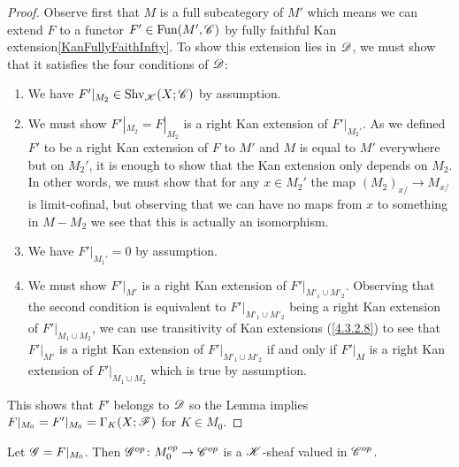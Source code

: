 \documentclass[../../thesis.tex]{subfiles}
\begin{document}
\begin{proof}
    Observe first that $M$ is a full subcategory of $M'$ which means we can extend $F$ to a functor $F'\in\mathrm{Fun}(M',\mathscr{C})$ by fully faithful Kan extension\ref{KanFullyFaithInfty}.
    To show this extension lies in $\mathscr{D}$, we must show that it satisfies the four conditions of $\mathscr{D}$:
    \begin{enumerate}
        \item We have $F'|_{M_2} \in \mathrm{Shv}_{\mathscr{K}}(X;\mathscr{C})$ by assumption.
        \item We must show $F'|_{M_2}=F|_{M_2}$ is a right Kan extension of $F'|_{M_2'}$.
              As we defined $F'$ to be a right Kan extension of $F$ to $M'$ and $M$ is equal to $M'$ everywhere but on $M_2'$, it is enough to show that the Kan extension only depends on $M_2$.
              In other words, we must show that for any $x \in M_2'$ the map $(M_2)_{x/} \to M_{x/}$ is limit-cofinal, but observing that we can have no maps from $x$ to something in $M - M_2$ we see that this is actually an isomorphism.
        \item We have $F'|_{M_1'}=0$ by assumption.
        \item We must show $F'|_{M'}$ is a right Kan extension of $F'|_{M'_1 \cup M'_2}$.
              Observing that the second condition is equivalent to $F'|_{M'_1 \cup M'_2}$ being a right Kan extension of $F'|_{M_1 \cup M_2}$, we can use transitivity of Kan extensions (\ref{4.3.2.8}) to see that $F'|_{M'}$ is a right Kan extension of $F'|_{M'_1 \cup M'_2}$ if and only if $F'|_{M}$ is a right Kan extension of $F'|_{M_1 \cup M_2}$ which is true by assumption.
    \end{enumerate}
    This shows that $F'$ belongs to $\mathscr{D}$ so the Lemma implies $F|_{M_0} = F'|_{M_0} = \Gamma_K(X;\mathscr{F})$ for $K\in M_0$.
\end{proof}
\begin{lemma}
    Let $\mathscr{G} = F|_{M_0}$.
    Then $\mathscr{G}^{op}\colon M_0^{op} \to \mathscr{C}^{op}$ is a $\mathscr{K}$-sheaf valued in $\mathscr{C}^{op}$.
\end{lemma}
\end{document}
